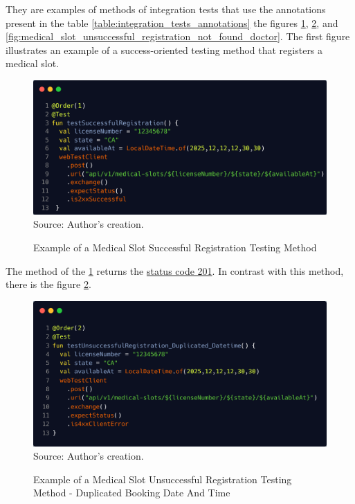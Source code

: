 They are examples of methods of integration tests that use the annotations present in the table \ref{table:integration_tests_annotations} the figures \ref{fig:medical_slot_successful_registration_example},
\ref{fig:medical_slot_unsuccessful_registration_duplicated_datetime},
and \ref{fig:medical_slot_unsuccessful_registration_not_found_doctor}. The first figure illustrates an example of a success-oriented testing method that registers a medical slot.

\begin{figure}[H]
    \centering
    \caption{Example of a Medical Slot Successful Registration Testing Method}
    \includegraphics[width=1\linewidth]{figures/medical_slot_successful_registration_example.png}
    \footnotesize Source: Author's creation.
    \label{fig:medical_slot_successful_registration_example}
\end{figure}

The method of the \ref{fig:medical_slot_successful_registration_example} returns the \hyperref[tab:summary_http_status_codes]{status code 201}. In contrast with this method, there is the figure \ref{fig:medical_slot_unsuccessful_registration_duplicated_datetime}.

\begin{figure}[H]
    \centering
    \caption{Example of a Medical Slot Unsuccessful Registration Testing Method - Duplicated Booking Date And Time}
    \includegraphics[width=1\linewidth]{figures/medical_slot_unsuccessful_registration_duplicated_datetime.PNG}
    \footnotesize Source: Author's creation.
    \label{fig:medical_slot_unsuccessful_registration_duplicated_datetime}
\end{figure}

